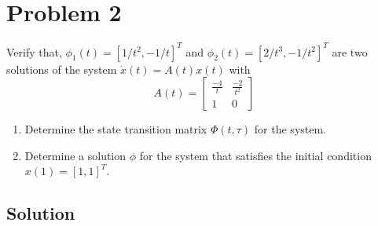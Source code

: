 \section*{Problem 2}

Verify that, \( \phi_1(t) = [1/t^2, -1/t]^T \) and \( \phi_2(t) = [2/t^3, -1/t^2]^T \) are two solutions of the system \( \dot x(t) = A(t)x(t) \) with
\begin{equation*}
    A(t)
    =
    \begin{bmatrix}
        \frac{-4}{t} & \frac{-2}{t^2} \\
        1            & 0
    \end{bmatrix}
\end{equation*}

\begin{enumerate}[label= (\alph*)]
    \item Determine the state transition matrix \( \Phi(t,\tau) \) for the system.
    \item Determine a solution \( \phi \) for the system that satisfies the initial condition \( x(1) = {[1, 1]}^T \).
\end{enumerate}

\subsection*{Solution}
